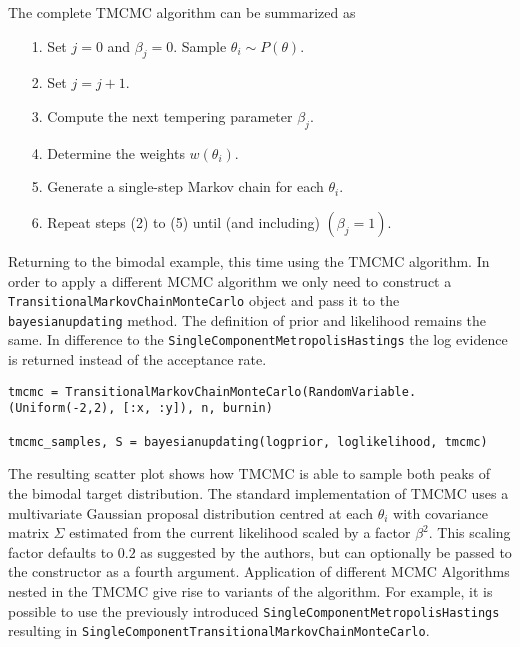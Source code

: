 The complete TMCMC algorithm can be summarized as



\begin{itemize}
\item[1. ] Set \(j=0\) and \(\beta_j=0\). Sample \(\theta_i \sim P(\theta)\).


\item[2. ] Set \(j = j+1\).


\item[3. ] Compute the next tempering parameter \(\beta_j\).


\item[4. ] Determine the weights \(w(\theta_i)\).


\item[5. ] Generate a single-step Markov chain for each \(\theta_i\).


\item[6. ] Repeat steps (2) to (5) until (and including) \((\beta_j=1)\).

\end{itemize}


Returning to the bimodal example, this time using the TMCMC algorithm. In order to apply a different MCMC algorithm we only need to construct a \texttt{TransitionalMarkovChainMonteCarlo} object and pass it to the \texttt{bayesianupdating} method. The definition of prior and likelihood remains the same. In difference to the \texttt{SingleComponentMetropolisHastings} the log evidence is returned instead of the acceptance rate.




\begin{verbatim}
tmcmc = TransitionalMarkovChainMonteCarlo(RandomVariable.(Uniform(-2,2), [:x, :y]), n, burnin)

tmcmc_samples, S = bayesianupdating(logprior, loglikelihood, tmcmc)
\end{verbatim}



\begin{figure}
\centering
{}
\caption{}
\end{figure}




The resulting scatter plot shows how TMCMC is able to sample both peaks of the bimodal target distribution. The standard implementation of TMCMC uses a multivariate Gaussian proposal distribution centred at each \(\theta_i\) with covariance matrix \(\Sigma\) estimated from the current likelihood scaled by a factor \(\beta^2\). This scaling factor defaults to \(0.2\) as suggested by the authors, but can optionally be passed to the constructor as a fourth argument. Application of different MCMC Algorithms nested in the TMCMC give rise to variants of the algorithm. For example, it is possible to use the previously introduced \texttt{SingleComponentMetropolisHastings} resulting in \texttt{SingleComponentTransitionalMarkovChainMonteCarlo}.




